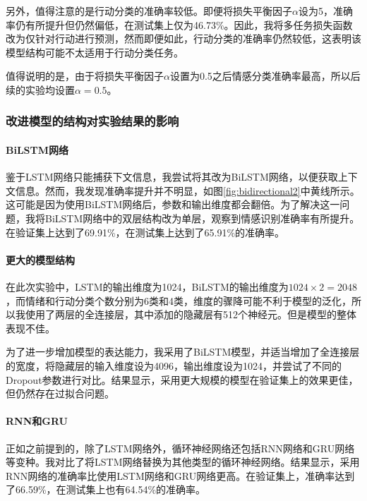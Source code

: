 另外，值得注意的是行动分类的准确率较低。即便将损失平衡因子$\alpha$设为5，准确率仍有所提升但仍然偏低，在测试集上仅为46.73\%。因此，我将多任务损失函数改为仅针对行动进行预测，然而即便如此，行动分类的准确率仍然较低，这表明该模型结构可能不太适用于行动分类任务。



值得说明的是，由于将损失平衡因子$\alpha$设置为0.5之后情感分类准确率最高，所以后续的实验均设置$\alpha=0.5$。

\subsubsection{改进模型的结构对实验结果的影响}

\paragraph{BiLSTM网络}

鉴于LSTM网络只能捕获下文信息，我尝试将其改为BiLSTM网络，以便获取上下文信息。然而，我发现准确率提升并不明显，如图\ref{fig:bidirectional2}中黄线所示。这可能是因为使用BiLSTM网络后，参数和输出维度都会翻倍。为了解决这一问题，我将BiLSTM网络中的双层结构改为单层，观察到情感识别准确率有所提升。在验证集上达到了69.91\%，在测试集上达到了65.91\%的准确率。



\paragraph{更大的模型结构}

在此次实验中，LSTM的输出维度为1024，BiLSTM的输出维度为$1024\times 2 = 2048$，而情绪和行动分类个数分别为6类和4类，维度的骤降可能不利于模型的泛化，所以我使用了两层的全连接层，其中添加的隐藏层有512个神经元。但是模型的整体表现不佳。



为了进一步增加模型的表达能力，我采用了BiLSTM模型，并适当增加了全连接层的宽度，将隐藏层的输入维度设为4096，输出维度设为1024，并尝试了不同的Dropout参数进行对比。结果显示，采用更大规模的模型在验证集上的效果更佳，但仍然存在过拟合问题。



\paragraph{RNN和GRU}

正如之前提到的，除了LSTM网络外，循环神经网络还包括RNN网络和GRU网络等变种。我对比了将LSTM网络替换为其他类型的循环神经网络。结果显示，采用RNN网络的准确率比使用LSTM网络和GRU网络更高。在验证集上，准确率达到了66.59\%，在测试集上也有64.54\%的准确率。

